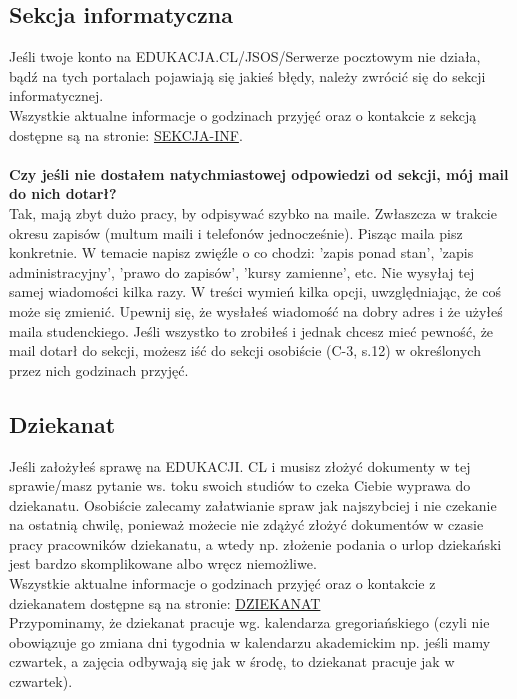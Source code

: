 \documentclass[11pt]{article}
\begin{document}
\subsection{Sekcja informatyczna}
\indent \hspace{0.5cm} Jeśli twoje konto na EDUKACJA.CL/JSOS/Serwerze pocztowym nie działa, bądź na tych portalach pojawiają się jakieś błędy, należy zwrócić się do sekcji informatycznej.\\
\indent Wszystkie aktualne informacje o godzinach przyjęć oraz o kontakcie z sekcją dostępne są \linebreak na stronie:
{\color{blue}\href{http://weka.pwr.edu.pl/o-wydziale/kontakt/sekcja-informatyczna}{SEKCJA-INF}}.\\\\
\textbf{Czy jeśli nie dostałem natychmiastowej odpowiedzi od sekcji, mój mail do nich dotarł?}\\
\indent Tak, mają zbyt dużo pracy, by odpisywać szybko na maile. Zwłaszcza w trakcie okresu zapisów (multum maili i telefonów jednocześnie). Pisząc maila pisz konkretnie. W temacie napisz zwięźle o co chodzi: 'zapis ponad stan', 'zapis administracyjny', 
'prawo do zapisów', 'kursy zamienne', etc. Nie wysyłaj tej samej wiadomości kilka razy. W treści wymień kilka opcji, uwzględniając, że coś może się zmienić. Upewnij się, 
że wysłałeś wiadomość na dobry adres \linebreak i że użyłeś maila studenckiego. Jeśli wszystko 
to zrobiłeś i jednak chcesz mieć pewność, że mail dotarł do sekcji, możesz iść do sekcji osobiście (C-3, s.12) w określonych przez nich godzinach przyjęć.

\subsection{Dziekanat}
\indent \hspace{0.5cm} Jeśli założyłeś sprawę na EDUKACJI. CL i musisz złożyć dokumenty w tej sprawie/masz pytanie ws. toku swoich studiów to czeka Ciebie wyprawa do dziekanatu. Osobiście zalecamy załatwianie spraw jak najszybciej i nie czekanie na ostatnią chwilę, ponieważ możecie nie zdążyć złożyć dokumentów w czasie pracy pracowników dziekanatu, a wtedy np. złożenie podania o urlop dziekański jest bardzo skomplikowane albo wręcz niemożliwe.\\
\indent Wszystkie aktualne informacje o godzinach przyjęć oraz o kontakcie z dziekanatem dostępne są na stronie: {\color{blue}\href{http://weka.pwr.edu.pl/o-wydziale/kontakt/dziekanat}{DZIEKANAT}} \\
\indent Przypominamy, że dziekanat pracuje wg. kalendarza gregoriańskiego (czyli nie obowiązuje go zmiana dni tygodnia w kalendarzu akademickim np. jeśli mamy czwartek, a zajęcia odbywają się jak w środę, to dziekanat pracuje jak w czwartek).
\end{document}
